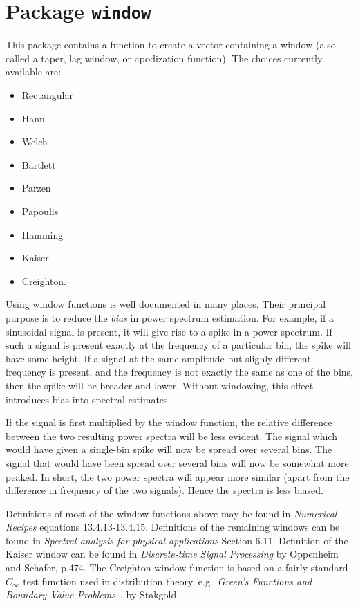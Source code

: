 \chapter{Package \texttt{window}}

This package contains a function to create a vector
containing a window (also called
a taper, lag window, or apodization function).  The choices
currently available are:
\begin{itemize}
\item Rectangular
\item Hann
\item Welch
\item Bartlett
\item Parzen
\item Papoulis
\item Hamming
\item Kaiser
\item Creighton.
\end{itemize}
Using window functions is well documented in many places.  Their
principal purpose is to reduce the {\it bias} in power spectrum
estimation.  For example, if a sinusoidal signal is present, it will
give rise to a spike in a power spectrum.  If such a  signal is present
exactly at the frequency of a particular bin, the spike will have some
height.  If a signal at the same amplitude but slighly different
frequency is present, and the frequency is not exactly the same
as one of the bins, then
the spike will be broader and lower. Without windowing, this effect introduces
bias into spectral estimates.

If the signal is first multiplied by the window function, the
relative difference between the two resulting power spectra will be
less evident.  The signal which would have given a single-bin spike
will now be spread over several bins.  The signal that would have
been spread over several bins will now be somewhat more peaked.
In short, the two power spectra will appear more similar (apart from
the difference in frequency of the two signals).  Hence the spectra
is less biased.

Definitions of most of the window functions above may be found in {\it
Numerical Recipes} \cite{numrec} equations 13.4.13-13.4.15.  Definitions of
the remaining windows can be found in {\it Spectral analysis for physical
applications} \cite{pw} Section 6.11. Definition of the Kaiser window can be
found in \textit{Discrete-time Signal Processing} by Oppenheim and Schafer, p.474.
The Creighton window function is based on a fairly standard $C_\infty$
test function used in distribution theory, e.g.\ \textit{Green's
Functions and Boundary Value Problems}~\cite{stakgold}, by Stakgold.




